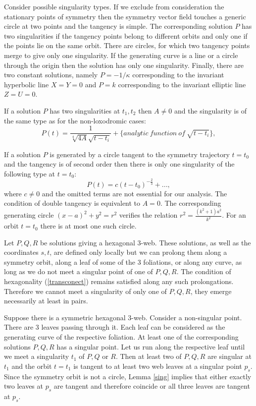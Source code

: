 \documentclass[11pt,a4paper]{article}
\begin{document}
Consider possible singularity types. If we exclude from consideration the stationary points of symmetry  then the symmetry vector field touches a generic circle at two points and the tangency is simple. The corresponding solution $P$ has two singularities if the tangency points belong to  different  orbits and only one if the points lie on the same orbit. There are circles, for which two tangency  points merge  to give only one singularity. If the generating curve is a line or a circle through the origin then the solution has only one singularity. Finally, there are two constant solutions, namely $P=-1/\kappa$ corresponding to the invariant hyperbolic line $X=Y=0$ and $P=k$ corresponding to  the invariant elliptic line $Z=U=0$. 

If a solution $P$ has  two singularities at $t_1,t_2$ then $A\ne 0$ and the singularity is of the same type as for the  non-loxodromic cases: 
$$
P(t)=\frac{1}{\sqrt[4]{4A}\sqrt{t-t_i}}+\{analytic\ function \ of\ \sqrt{t-t_i}\},
$$

If a solution $P$ is generated by a circle tangent to the symmetry trajectory $t=t_0$ and the tangency is of second order then  there is only one singularity of the following type at $t=t_0$: 
$$
P(t)=c(t-t_0)^{-\frac{2}{3}}+...,
$$
where $c\ne 0$ and the omitted terms are not essential for our analysis. 
The condition of double tangency is equivalent to $A=0$. The corresponding generating circle $(x-a)^2+y^2=r^2$ verifies the relation $r^2=\frac{(k^2 + 1)a^2}{k^2}.$ For an orbit $t=t_0$ there is at most one such circle.  

     
Let $P,Q,R$ be solutions giving a hexagonal 3-web. These solutions, as well as the coordinates $s,t$, are defined only locally but we can prolong them along a symmetry orbit, along a leaf of some of the 3 foliations, or along any curve, as long as we do not meet a singular point of one of  $P,Q,R$. 
The condition of hexagonality (\ref{transconect}) remains satisfied along any such prolongations. Therefore we cannot meet a singularity of only one of $P,Q,R$, they emerge necessarily at least in pairs.  

Suppose there is a symmetric  hexagonal 3-web. Consider a non-singular point. There are 3 leaves passing through it. Each leaf can be considered as the generating curve of the respective foliation. At least one of the corresponding solutions $P,Q,R$ has a singular point.  Let us run along the respective leaf until we meet a singularity $t_1$ of $P,Q$ or $R$.  Then at least two of $P,Q,R$ are singular at $t_1$ and the orbit $t=t_1$ is tangent to at least two web leaves at a singular point $p_s$.  Since the symmetry orbit is not a circle, Lemma \ref{sing} implies that either exactly two leaves at $p_s$  are tangent and therefore coincide or all three leaves are tangent at $p_s$. 
\end{document}
